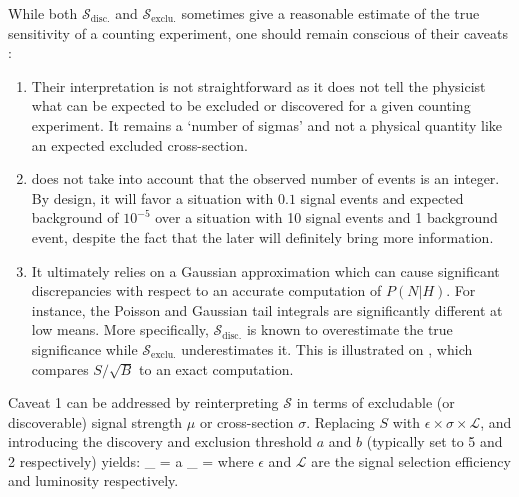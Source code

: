     While both $\mathcal{S}_\text{disc.}$ and $\mathcal{S}_\text{exclu.}$
    sometimes give a reasonable estimate of the true sensitivity of a counting
    experiment, one should remain conscious of their caveats \cite{Punzi}:

    \begin{enumerate}
      \item Their interpretation is not straightforward as it does not tell the
          physicist what can be expected to be excluded or discovered for a
          given counting experiment. It remains a `number of sigmas' and not a
          physical quantity like an expected excluded cross-section.
      \item {} does not take into account that the observed
          number of events is an integer. By design, it will favor a situation
          with $0.1$ signal events and expected background of $10^{-5}$ over a
          situation with 10 signal events and 1 background event, despite the
          fact that the later will definitely bring more information.
      \item It ultimately relies on a Gaussian approximation which can cause
          significant discrepancies with respect to an accurate computation of
          $P(N|H)$. For instance, the Poisson and Gaussian tail integrals are
          significantly different at low means. More specifically,
          $\mathcal{S}_\text{disc.}$ is known to overestimate the true
          significance while $\mathcal{S}_\text{exclu.}$ underestimates it.
          This is illustrated on , which compares
          $S/\sqrt{B}$ to an exact computation.
    \end{enumerate}

    Caveat 1 can be addressed by reinterpreting $\mathcal{S}$ in terms of
    excludable (or discoverable) signal strength $\mu$ or cross-section
    $\sigma$. Replacing $S$ with $\epsilon \times \sigma \times \mathcal{L}$,
    and introducing the discovery and exclusion threshold $a$ and $b$ (typically
    set to 5 and 2 respectively) yields:
    {
        \mathcal{\sigma}_ = a \cdot {}
       \hspace*{2cm}
       \mathcal{\sigma}_ =  \times {}
   }
    where $\epsilon$ and $\mathcal{L}$ are the signal selection efficiency and
    luminosity respectively.

